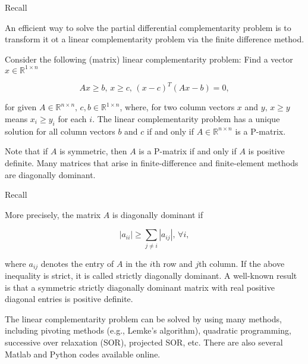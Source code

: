 \documentclass{beamer}
\begin{document}
\begin{frame}{Recall}

    {\footnotesize \footnotesize
    An efficient way to solve the partial differential complementarity problem is
    to transform it ot a linear complementarity problem via the finite difference
    method.
    \vspace{1em}

    Consider the following (matrix) linear complementarity problem: 
    Find a vector \( x \in \mathbb{R}^{1 \times n} \)

    \[
    Ax \geq b, \, x \geq c, \, (x - c)^T (Ax - b) = 0,
    \]

    for given \( A \in \mathbb{R}^{n \times n}, \, c, b \in \mathbb{R}^{1 \times n} \), where, 
    for two column vectors \( x \) and \( y, \, x \geq y \) means \( x_i \geq y_i \) for each \( i \).
    The linear complementarity problem has a unique solution for all
     column vectors \( b \) and \( c \) if and only if \( A \in \mathbb{R}^{n \times n} \) is a P-matrix.
    \vspace{1em}
    
     \pause Note that if \( A \) is symmetric, then \( A \) is a P-matrix if and only if \( A \) is positive definite.
     Many matrices that arise in finite-difference and finite-element methods are diagonally dominant.
    }
    
\end{frame}
\begin{frame}{Recall}

    {\footnotesize \footnotesize
      More precisely, the matrix \( A \) is diagonally dominant if

    \[
    |a_{ii}| \geq \sum_{j \neq i} |a_{ij}|, \, \forall i,
    \]

    where \( a_{ij} \) denotes the entry of \( A \) in the \( i \)th row and \( j \)th column. 
    If the above inequality is strict, it is called strictly diagonally dominant. A well-known result is that a 
    symmetric strictly diagonally dominant matrix with real positive diagonal entries is positive definite.

    \vspace{1em}

     \pause The linear complementarity problem can be solved by using many methods, 
    including pivoting methods (e.g., Lemke's algorithm), quadratic programming, 
    successive over relaxation (SOR), projected SOR, etc. There are also several 
    Matlab and Python codes available online.

    }
    
\end{frame}
\end{document}
